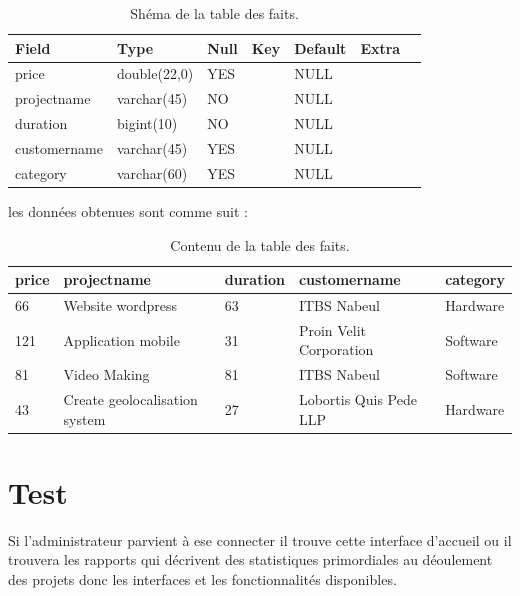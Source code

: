 \begin{table}

\begin{tabular}{|l|l|l|l|l|l|l|}
\hline
 \textbf{Field}        & \textbf{Type}         & \textbf{Null} & \textbf{Key}  & \textbf{Default} & \textbf{Extra}   \\
\hline
price        & double(22,0) & YES  &     & NULL    &         \\
\hline
projectname  & varchar(45)  & NO   &     & NULL    &         \\
\hline
duration     & bigint(10)   & NO   &     & NULL    &         \\
\hline
customername & varchar(45)  & YES  &     & NULL    &         \\
\hline
category     & varchar(60)  & YES  &     & NULL    &         \\
\hline
\end{tabular}
\centering
\caption{Sh\'{e}ma de la table des faits.}
\end{table}



les donn\'{e}es obtenues sont comme suit :

\begin{table}

\begin{tabular}{|l|l|l|l|l|}
\hline
price & projectname                   & duration & customername            & category  \\
\hline
66    & Website wordpress             & 63       & ITBS Nabeul             & Hardware  \\
\hline
121   & Application mobile            & 31       & Proin Velit Corporation & Software  \\
\hline
81    & Video Making                  & 81       & ITBS Nabeul             & Software  \\
\hline
43    & Create geolocalisation system & 27       & Lobortis Quis Pede LLP  & Hardware  \\
\hline
\end{tabular}
\centering
\caption{Contenu de la table des faits.}
\end{table}


\section{Test}


Si l'administrateur parvient \`{a} ese connecter il trouve cette interface d'accueil
ou il trouvera les rapports qui d\'{e}crivent des statistiques primordiales au
d\'{e}oulement des projets donc les interfaces et les fonctionnalit\'{e}s disponibles.

